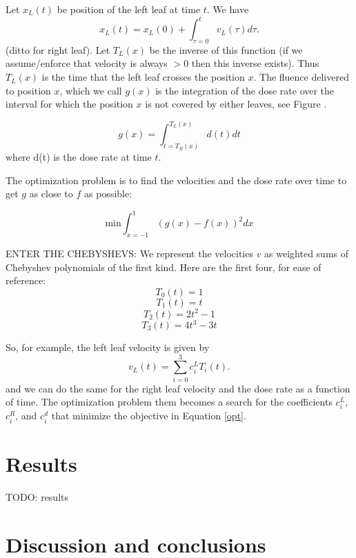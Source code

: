 \documentclass[12pt]{article}
\newcommand{\todo}[1]{\comment{{\color{lightblue}\par {[{\bf TO DO: } {\em #1}} ] \\    }}}
\begin{document}
Let $x_L(t)$ be position of the left leaf at time $t$. We have
\begin{equation}
  x_L(t) = x_L(0) + \int_{\tau=0}^t v_L(\tau) d\tau.
\end{equation}
\noindent (ditto for right leaf). Let $T_L(x)$ be the inverse of this function
(if we assume/enforce that velocity is always $>0$ then this inverse exists). Thus
$T_L(x)$ is the time that the left leaf crosses the position $x$. The fluence delivered to position
$x$, which we call $g(x)$ is the integration of the dose rate over the interval for which the position $x$ is not covered by either leaves,
see Figure \todo{sketch}.


\begin{equation}
  g(x) = \int_{t = T_R(x)}^{T_L(x)} d(t) dt
\end{equation}
\noindent where d(t) is the dose rate at time $t$.

The optimization problem is to find the velocities and the dose rate over time to get $g$ as close to $f$ as possible:

\begin{equation}
\mathrm{min} \int_{x=-1}^1 \left ( g(x) - f(x) \right )^2 dx
\end{equation}

ENTER THE CHEBYSHEVS: We represent the velocities $v$ as weighted sums of Chebyshev polynomials of the first kind.
Here are the first four, for ease of reference:
$$
T_0(t) = 1
$$
$$
T_1(t) = t
$$
$$
T_2(t) = 2t^2 -1
$$
$$
T_3(t) = 4t^3 - 3t
$$


So, for example, the left leaf velocity is given by
$$
v_L(t) = \sum_{i=0}^3 c^L_i T_i(t).
$$
\noindent and we can do the same for the right leaf velocity and the dose rate as a function of time.
The optimization problem them becomes a search for the coefficients $c^L_i$, $c^R_i$, and $c^d_i$ that minimize the objective in Equation \ref{opt}.

\section{Results}

TODO:  results

\section{Discussion and conclusions}



\end{document}
